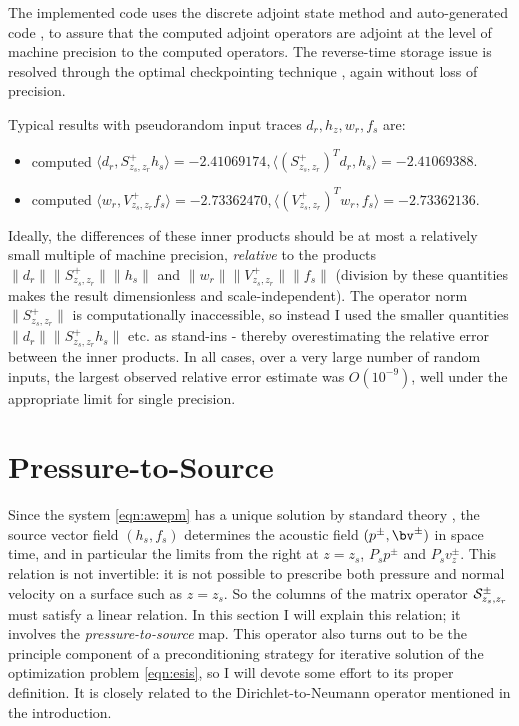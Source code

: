 The implemented code uses the discrete adjoint state method and auto-generated code \cite[]{TapenadeRef13}, to
assure that the computed adjoint operators are adjoint at the level of
machine precision to the computed operators. The reverse-time storage
issue is resolved through the optimal checkpointing technique
\cite[]{Griewank:book,Symes:06a-pub}, again without loss of precision.

Typical results with pseudorandom input traces $d_r, h_z, w_r, f_s$ are:
\begin{itemize}
\item computed $\langle d_r, S^+_{z_s,z_r}h_s\rangle = -2.41069174,
  \langle (S^+_{z_s,z_r})^Td_r, h_s \rangle = -2.41069388.$
\item  computed $\langle w_r, V^+_{z_s,z_r}f_s\rangle = -2.73362470,
  \langle (V^+_{z_s,z_r})^Tw_r, f_s \rangle = -2.73362136.$
\end{itemize}
Ideally, the differences of these inner products should be at most a
relatively small multiple of machine precision, {\em relative} to the
products $\|d_r\|\| S^+_{z_s,z_r}\|\|h_s\|$ and
$\|w_r\|\|V^+_{z_s,z_r}\|\|f_s\|$ (division by these quantities makes the result
dimensionless and scale-independent). The operator norm $\| S^+_{z_s,z_r}\|$ is
computationally inaccessible, so instead I used the smaller quantities
$\|d_r\|\| S^+_{z_s,z_r}h_s\|$ etc. as stand-ins - thereby
overestimating the relative error between the inner products. In all
cases, over a very large number of random inputs, the largest observed
relative error estimate was $O(10^{-9})$, well under the appropriate limit for
single precision.

\section{Pressure-to-Source}

Since the system \ref{eqn:awepm} has a unique solution by standard
theory \cite[]{Lax:PDENotes}, the source vector field $(h_s,f_s)$
determines the acoustic field $(p^{\pm},\bv^{\pm})$ in space time, and
in particular the limits from the right at $z=z_s$, $P_sp^{\pm}$ and
$P_sv_z^{\pm}$. This relation is not invertible: it is not possible to
prescribe both pressure and normal velocity on a surface such as
$z=z_s$. So the columns of the matrix operator
${\cal S}^{\pm}_{z_s,z_r}$ must satisfy a linear relation. In this
section I will explain this relation; it involves the {\em
  pressure-to-source} map. This operator also turns out to be the
principle component of a preconditioning strategy for iterative
solution of the optimization problem \ref{eqn:esis}, so I will devote
some effort to its proper definition. It is closely related to the
Dirichlet-to-Neumann operator mentioned in the introduction.


